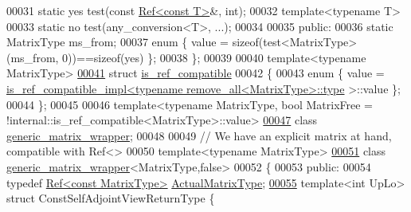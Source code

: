 \begin{DoxyCode}
00031   \textcolor{keyword}{static} yes test(\textcolor{keyword}{const} \hyperlink{group___core___module_class_eigen_1_1_ref}{Ref<const T>}&, \textcolor{keywordtype}{int});
00032   \textcolor{keyword}{template}<\textcolor{keyword}{typename} T>
00033   \textcolor{keyword}{static} no  test(any\_conversion<T>, ...);
00034 
00035 \textcolor{keyword}{public}:
00036   \textcolor{keyword}{static} MatrixType ms\_from;
00037   \textcolor{keyword}{enum} \{ value = \textcolor{keyword}{sizeof}(test<MatrixType>(ms\_from, 0))==\textcolor{keyword}{sizeof}(yes) \};
00038 \};
00039 
00040 \textcolor{keyword}{template}<\textcolor{keyword}{typename} MatrixType>
\hyperlink{struct_eigen_1_1internal_1_1is__ref__compatible}{00041} \textcolor{keyword}{struct }\hyperlink{struct_eigen_1_1internal_1_1is__ref__compatible}{is\_ref\_compatible}
00042 \{
00043   \textcolor{keyword}{enum} \{ value = \hyperlink{struct_eigen_1_1internal_1_1is__ref__compatible__impl}{is\_ref\_compatible\_impl<typename remove\_all<MatrixType>::type}
      >::value \};
00044 \};
00045 
00046 template<typename MatrixType, bool MatrixFree = !internal::is\_ref\_compatible<MatrixType>::value>
\hyperlink{class_eigen_1_1internal_1_1generic__matrix__wrapper}{00047} \textcolor{keyword}{class }\hyperlink{class_eigen_1_1internal_1_1generic__matrix__wrapper}{generic\_matrix\_wrapper};
00048 
00049 \textcolor{comment}{// We have an explicit matrix at hand, compatible with Ref<>}
00050 \textcolor{keyword}{template}<\textcolor{keyword}{typename} MatrixType>
\hyperlink{class_eigen_1_1internal_1_1generic__matrix__wrapper_3_01_matrix_type_00_01false_01_4}{00051} \textcolor{keyword}{class }\hyperlink{class_eigen_1_1internal_1_1generic__matrix__wrapper}{generic\_matrix\_wrapper}<MatrixType,false>
00052 \{
00053 \textcolor{keyword}{public}:
00054   \textcolor{keyword}{typedef} \hyperlink{group___core___module}{Ref<const MatrixType>} \hyperlink{group___core___module}{ActualMatrixType};
\hyperlink{struct_eigen_1_1internal_1_1generic__matrix__wrapper_3_01_matrix_type_00_01false_01_4_1_1_const_self_adjoint_view_return_type}{00055}   \textcolor{keyword}{template}<\textcolor{keywordtype}{int} UpLo> \textcolor{keyword}{struct }ConstSelfAdjointViewReturnType \{

\end{DoxyCode}
